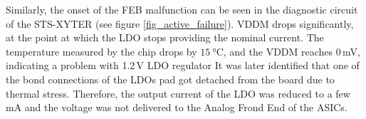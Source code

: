 Similarly, the onset of the \gls{FEB} malfunction can be seen in the diagnostic circuit of the STS-XYTER (see figure \ref{fig_active_failure}). VDDM drops significantly, at the point at which the \gls{LDO} stops providing the nominal current. The temperature measured by the chip drops by $\SI{15}{\celsius}$, and the VDDM reaches 0\,mV, indicating a problem with 1.2\,V \gls{LDO} regulator It was later identified that one of the bond connections of the \glspl{LDO} pad got detached from the board due
to thermal stress. Therefore, the output current of the \gls{LDO} was reduced to a few mA and the voltage was not delivered to the Analog Frond End of the \glspl{ASIC}. 

\begin{table}[!h]
\centering
\caption{Detailed description of the \gls{LDO} failure with regard to the type and number of cycles}
\label{tab:setB}
\end{table}
